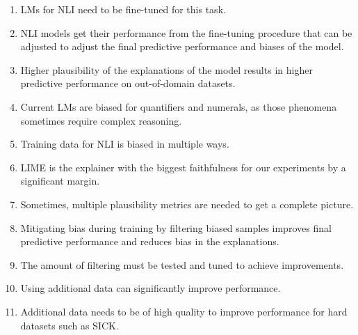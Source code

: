 \begin{enumerate}
    \item \acp{LM} for \ac{NLI} need to be fine-tuned for this task.
    \item \ac{NLI} models get their performance from the fine-tuning procedure that can be adjusted to adjust the final predictive performance and biases of the model.
    \item Higher plausibility of the explanations of the model results in higher predictive performance on out-of-domain datasets.
    \item Current \acp{LM} are biased for quantifiers and numerals, as those phenomena sometimes require complex reasoning.
    \item Training data for \ac{NLI} is biased in multiple ways.
    \item \acs{LIME} is the explainer with the biggest faithfulness for our experiments by a significant margin.
    \item Sometimes, multiple plausibility metrics are needed to get a complete picture.
    \item Mitigating bias during training by filtering biased samples improves final predictive performance and reduces bias in the explanations.
    \item The amount of filtering must be tested and tuned to achieve improvements.
    \item Using additional data can significantly improve performance.
    \item Additional data needs to be of high quality to improve performance for hard datasets such as \acs{SICK}.
\end{enumerate}